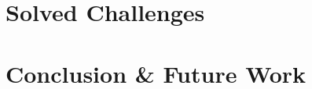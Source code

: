 \documentclass{scrartcl}
\begin{document}







\section{Solved Challenges}

\section{Conclusion \& Future Work}
\end{document}
